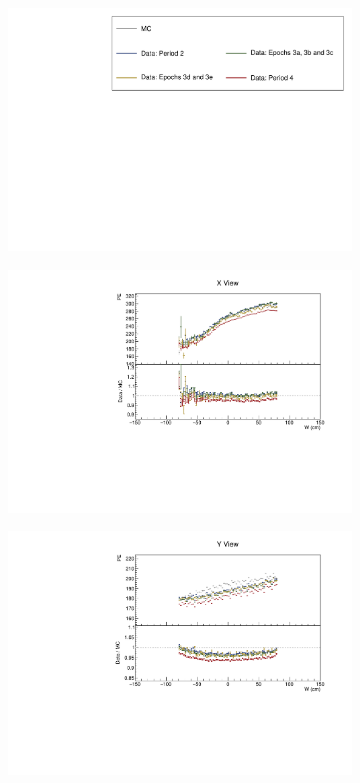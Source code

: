 \documentclass[12pt,a4paper]{article}
\begin{document}
\begin{figure}[!ht]
  \begin{subfigure}{\textwidth}
  \centering
    \includegraphics[height=0.2\linewidth]{essentialsec_tb/legend.pdf}
  \end{subfigure}
  \vspace*{2mm}

  \begin{subfigure}{0.5\textwidth}
    \includegraphics[width=\linewidth]{essentialsec_tb/pe_w_x.pdf}
  \end{subfigure}
  \begin{subfigure}{0.5\textwidth}
    \includegraphics[width=\linewidth]{essentialsec_tb/pe_w_y.pdf}

\end{subfigure}
\end{figure}
\end{document}
